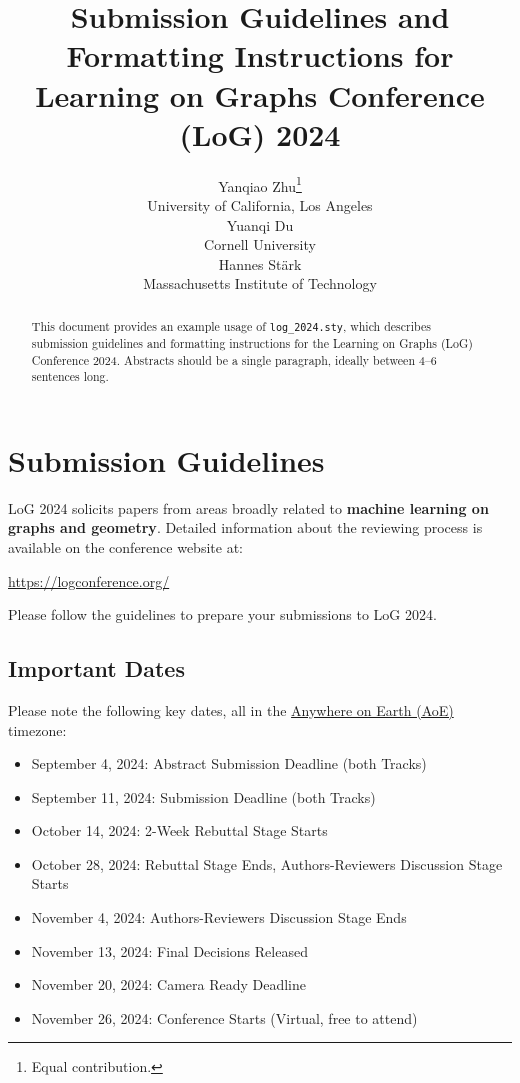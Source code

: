 \documentclass{article}
\title[Submission Guidelines and Formatting Instructions for LoG Conference 2024]{Submission Guidelines and Formatting Instructions for Learning on Graphs Conference (LoG) 2024}
\author[Y. Zhu et al.]{%
Yanqiao Zhu\thanks{Equal contribution.}\\
University of California, Los Angeles\\
\email{yzhu@cs.ucla.edu}\And
Yuanqi Du\footnotemark[1]\\
Cornell University\\
\email{yd392@cornell.edu}\And
Hannes Stärk\\
Massachusetts Institute of Technology\\
\email{hstark@mit.edu}
}
\begin{document}
\maketitle

\begin{abstract}
This document provides an example usage of \verb+log_2024.sty+, which describes submission guidelines and formatting instructions for the Learning on Graphs (LoG) Conference 2024.
Abstracts should be a single paragraph, ideally between 4--6 sentences long.
\end{abstract}

\section{Submission Guidelines}

LoG 2024 solicits papers from areas broadly related to \textbf{machine learning on graphs and geometry}.
Detailed information about the reviewing process is available on the conference website at:
\begin{center}
	\url{https://logconference.org/}
\end{center}
Please follow the guidelines to prepare your submissions to LoG 2024.

\subsection{Important Dates}

Please note the following key dates, all in the \href{https://www.timeanddate.com/time/zones/aoe}{Anywhere on Earth (AoE)} timezone:
\begin{itemize}
	\item September 4, 2024: Abstract Submission Deadline (both Tracks)
    \item September 11, 2024: Submission Deadline (both Tracks)
    \item October 14, 2024: 2-Week Rebuttal Stage Starts
    \item October 28, 2024: Rebuttal Stage Ends, Authors-Reviewers Discussion Stage Starts
    \item November 4, 2024: Authors-Reviewers Discussion Stage Ends
    \item November 13, 2024: Final Decisions Released
    \item November 20, 2024: Camera Ready Deadline
    \item November 26, 2024: Conference Starts (Virtual, free to attend)
\end{itemize}
\end{document}

